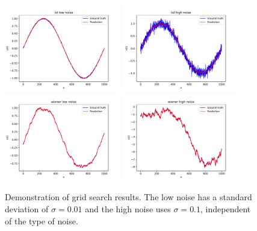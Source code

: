 \documentclass{article}
\begin{document}
\begin{figure}
    \centering
    \includegraphics[width=0.45\textwidth]{figures/iid_low_noise.pdf}
    \includegraphics[width=0.45\textwidth]{figures/iid_high_noise.pdf}
    \includegraphics[width=0.45\textwidth]{figures/wiener_low_noise.pdf}
    \includegraphics[width=0.45\textwidth]{figures/wiener_high_noise.pdf}
    \caption{Demonstration of grid search results. The low noise has a
    standard deviation of $\sigma =0.01$ and the high noise uses $\sigma=0.1$,
    independent of the type of noise.}
    \label{fig:sineresult}
\end{figure}
\end{document}
